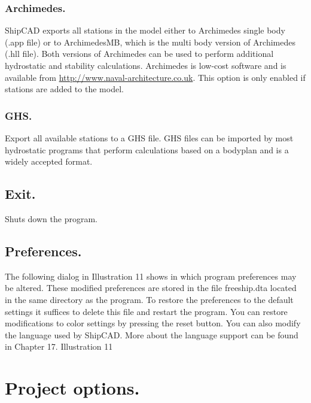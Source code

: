 \documentclass[12pt]{article}
\begin{document}
\subsubsection{Archimedes.}
ShipCAD exports all stations in the model either to Archimedes single body (.app file) or to
ArchimedesMB, which is the multi body version of Archimedes (.hll file). Both versions of
Archimedes can be used to perform additional hydrostatic and stability calculations. Archimedes is
low-cost software and is available from \url{http://www.naval-architecture.co.uk}. This option is only
enabled if stations are added to the model.

\subsubsection{GHS.}
Export all available stations to a GHS file. GHS files can be imported by most hydrostatic programs
that perform calculations based on a bodyplan and is a widely accepted format.

\subsection{Exit.}
Shuts down the program.

\subsection{Preferences.}
The following dialog in Illustration 11 shows in which program preferences may be altered. These
modified preferences are stored in the file freeship.dta located in the same directory as the
program. To restore the preferences to the default settings it suffices to delete this file and restart
the program. You can restore modifications to color settings by pressing the reset button.
You can also modify the language used by ShipCAD. More about the language support can be
found in Chapter 17.
Illustration 11

\section{Project options.}
\end{document}
